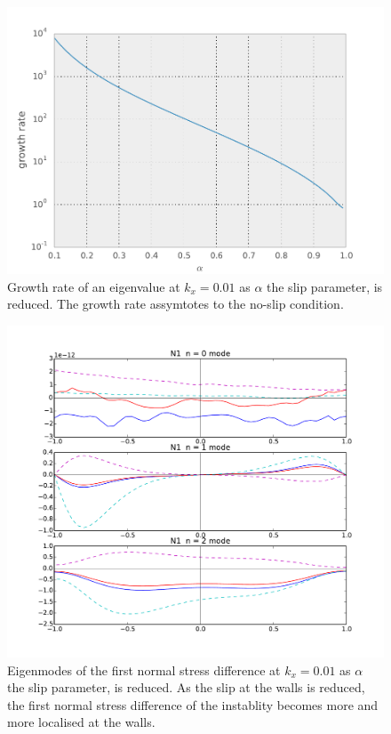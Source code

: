 \documentclass{jfm}
\begin{document}
\begin{figure}
    \centering
    \includegraphics[width=\textwidth]{./figures/vara_ev_kx001_Wi2_log}
    \caption{
	Growth rate of an eigenvalue at $k_x=0.01$ as $\alpha$ the slip
	parameter, is reduced. The growth rate assymtotes to the no-slip
	condition.
    }
    \label{fig:evaldiverg_varslip}
\end{figure}

\begin{figure}
    \centering
    \includegraphics[width=\textwidth]{./figures/eigenmode_varslip}
    \caption{
	Eigenmodes of the first normal stress difference at $k_x=0.01$ as
	$\alpha$ the slip parameter, is reduced. As the slip at the walls is
	reduced, the first normal stress difference of the instablity becomes
	more and more localised at the walls.
}
    \label{fig:eigenmode_varslip}
\end{figure}
\end{document}
